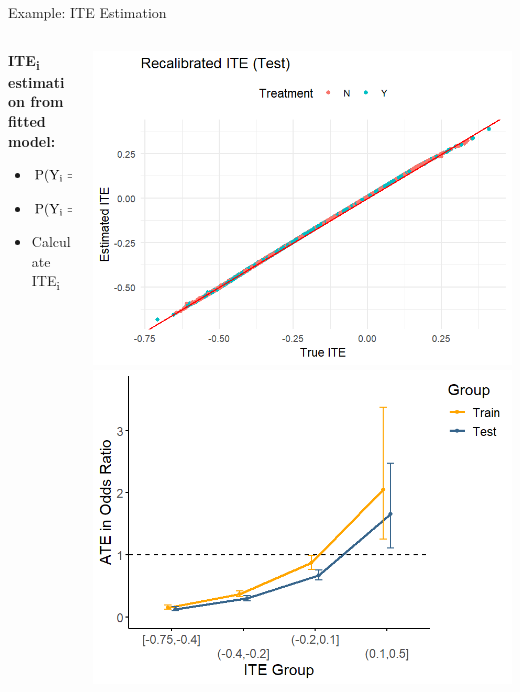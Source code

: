 \documentclass[onlytextwidth,english]{beamer}\usepackage[]{graphicx}\usepackage[]{xcolor}
\begin{document}
\begin{frame}{Example: ITE Estimation}

\begin{columns}
\begin{column}{0.5\textwidth}
\textbf{ITE\textsubscript{i} estimation from fitted model:}

\begin{itemize}
	\item \(\text{P}(\text{Y}_\text{i} = 1 \mid \textcolor{red}{\text{do(T = 1)}}, \mathbf{x_i})\)
	\item \(\text{P}(\text{Y}_\text{i} = 1 \mid \textcolor{red}{\text{do(T = 0)}}, \mathbf{x_i})\)
    \item Calculate ITE\textsubscript{i}
\end{itemize}

\end{column}

\begin{column}{0.5\textwidth}

\centering
\vspace{0.8cm}
\includegraphics[width=0.7\linewidth]{img/ITE_recal.png}
\vspace{0.8cm}
\includegraphics[width=0.7\linewidth]{img/ATE_ITE_recal.png}
\end{column}
\end{columns}

\end{frame}
\end{document}
